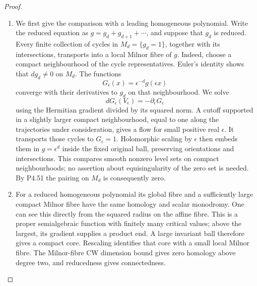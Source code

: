 \begin{proof}

\begin{enumerate}[label={$\langle1\rangle$\arabic*.},leftmargin=*]
\item We first give the comparison with a leading
homogeneous polynomial. Write the reduced equation
as $g=g_d+g_{d+1}+\cdots$, and suppose that $g_d$ is
reduced. Every finite collection of cycles in
$M_d=\{g_d=1\}$, together with its intersections,
transports into a local Milnor fibre of $g$.
Indeed, choose a compact neighbourhood of the cycle
representatives. Euler's identity shows that
$dg_d\ne0$ on $M_d$. The functions
\[
 G_\epsilon(x)=\epsilon^{-d}g(\epsilon x)
\]
converge with their derivatives to $g_d$ on that
neighbourhood. We solve
\[
 dG_\epsilon(V_\epsilon)
                     =-\partial_\epsilon G_\epsilon
\]
using the Hermitian gradient divided by its squared
norm. A cutoff supported in a slightly larger
compact neighbourhood, equal to one along the
trajectories under consideration, gives a flow for
small positive real $\epsilon$. It transports those
cycles to $G_\epsilon=1$. Holomorphic scaling by
$\epsilon$ then embeds them in $g=\epsilon^d$ inside
the fixed original ball, preserving orientations
and intersections. This compares smooth nonzero
level sets on compact neighbourhoods; no assertion
about equisingularity of the zero set is needed.
By P4.51 the pairing on $M_d$ is consequently zero.

\item For a reduced homogeneous polynomial its global
fibre and a sufficiently large compact Milnor fibre
have the same homology and scalar monodromy. One
can see this directly from the squared radius on
the affine fibre. This is a proper semialgebraic
function with finitely many critical values; above
the largest, its gradient supplies a product end.
A large invariant ball therefore gives a compact
core. Rescaling identifies that core with a small
local Milnor fibre. The Milnor-fibre CW dimension
bound gives zero homology above degree two, and
reducedness gives connectedness.


\end{enumerate}
\end{proof}
